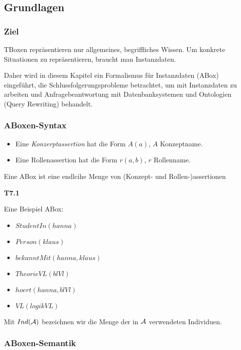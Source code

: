 \subsection{Grundlagen}

\subsubsection{Ziel}

TBoxen repräsentieren nur allgemeines, begriffliches Wissen. Um konkrete Situationen zu repräsentieren, braucht man Instanzdaten.

Daher wird in diesem Kapitel ein Formalismus für Instanzdaten (ABox) eingeführt, die Schlussfolgerungsprobleme betrachtet, um mit Instanzdaten zu arbeiten und Anfragebeantwortung mit Datenbanksystemen und Ontologien (Query Rewriting) behandelt.

\subsubsection{ABoxen-Syntax}

\begin{definition}

\begin{itemize}
	\item Eine \emph{Konzerptassertion} hat die Form $A(a)$, $A$ Konzeptname.
	\item Eine Rollenassertion hat die Form $r(a,b)$, $r$ Rollenname.
\end{itemize}

Eine ABox ist eine endlcihe Menge von (Konzept- und Rollen-)assertionen
\end{definition}

\textbf{T7.1}

Eine Beispiel ABox:

\begin{itemize}
	\item $StudentIn(hanna)$
	\item $Person(klaus)$
	\item $bekanntMit(hanna,klaus)$
	\item $TheorieVL(blVl)$
	\item $hoert(hanna, blVl)$
	\item $VL(logikVL)$
\end{itemize}

Mit $Ind(\mathcal{A})$ bezeichnen wir die Menge der in $\mathcal{A}$ verwendeten Individuen.

\subsubsection{ABoxen-Semantik}

